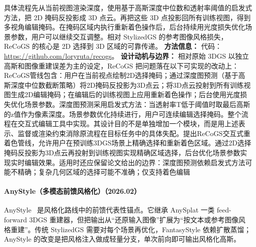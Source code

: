 具体流程先从当前视图渲染深度，使用基于高斯深度中位数和透射率阈值的启发式方法，把 2D 掩码反投影成 3D 点云。再把这些 3D 点投影回所有训练视图，得到多视角编辑掩码。在掩码区域内执行重新着色操作后，后台持续用光度损失优化场景参数，用户可以继续交互调整。相对 StylizedGS 的参考图像风格损失，ReCoGS 的核心是 2D 选择到 3D 区域的可靠传递。
\textbf{方法信息：} 代码：\url{https://github.com/loryruta/recogs}。
\textbf{设计动机与边界：} 相对原始 3DGS 以独立高斯和图像重建误差为主的设定，ReCoGS 把问题落在以下可实现的改动上：ReCoGS管线包含：用户在当前视点绘制2D选择掩码；通过深度图预测（基于高斯深度中位数截断策略）将2D掩码反投影为3D点云；将3D点云投射到所有训练视图生成2D编辑掩码；在编辑后的训练视图上应用重新着色操作；后台使用光度损失优化场景参数。深度图预测采用启发式方法：当透射率T低于阈值时取最后高斯的z值作为像素深度。场景参数优化持续进行，用户可连续编辑选择掩码。整个流程在交互式编辑工具中实现。其设计目的不是单独增加一个模块，而是用上述表示、监督或渲染约束消除原流程在目标任务中的具体失配。提出ReCoGS交互式重着色管线，允许用户在预训练3DGS场景上精确选择和重新着色区域。通过2D选择掩码反投影为3D点云再投射到训练视图实现精确区域选择，后台优化场景参数实现实时编辑效果。适用时还应保留论文给出的边界：深度图预测依赖启发式方法可能不精确；复杂几何区域的选择可能不准确；仅支持着色编辑
\paragraph{AnyStyle（多模态前馈风格化）（2026.02）}
AnyStyle~\cite{2602_04043} 是风格化路线中的前馈代表性锚点。它继承 AnySplat 一类 feed-forward 3DGS 重建器，但把输出从“还原输入图像”扩展为“按文本或参考图像风格重建”。传统 StylizedGS 需要对每个场景再优化，FantasyStyle 依赖扩散蒸馏；AnyStyle 的改变是把风格注入做成轻量分支，单次前向即可输出风格化高斯。

